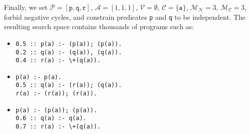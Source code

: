 \documentclass[runningheads]{llncs}
\newcommand{\predicates}{\mathcal{P}}
\newcommand{\variables}{\mathcal{V}}
\newcommand{\constants}{\mathcal{C}}
\newcommand{\arities}{\mathcal{A}}
\newcommand{\maxNumNodes}{\mathcal{M}_{\mathcal{N}}}
\newcommand{\maxNumClauses}{\mathcal{M}_{\mathcal{C}}}
\begin{document}
Finally, we set
$\predicates{} = [\texttt{p}, \texttt{q}, \texttt{r}]$, $\arities{} = [1, 1,
1]$, $\variables{} = \emptyset$, $\constants{} = \{ \texttt{a} \}$,
$\maxNumNodes{} = 3$, $\maxNumClauses{} = 3$, forbid negative cycles, and
constrain predicates \texttt{p} and \texttt{q} to be independent. The resulting
search space contains thousands of programs such as:

\begin{itemize}
\item
\begin{verbatim}
0.5 :: p(a) :- (p(a)); (p(a)).
0.2 :: q(a) :- (q(a)), (q(a)).
0.4 :: r(a) :- \+(q(a)).
\end{verbatim}
\item
\begin{verbatim}
p(a) :- p(a).
0.5 :: q(a) :- (r(a)); (q(a)).
r(a) :- (r(a)); (r(a)).
\end{verbatim}
\item
\begin{verbatim}
p(a) :- (p(a)); (p(a)).
0.6 :: q(a) :- q(a).
0.7 :: r(a) :- \+(q(a)).
\end{verbatim}
\end{itemize}
\end{document}
